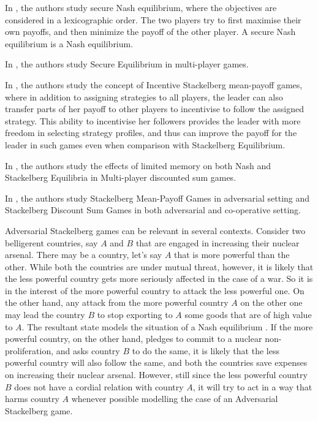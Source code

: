 In \cite{CHJ06}, the authors study secure Nash equilibrium, where the objectives are considered in a lexicographic order. The two players try to first maximise their own payoffs, and then minimize the payoff of the other player. A secure Nash equilibrium is a Nash equilibrium. 

In \cite{PFKSV14}, the authors study Secure Equilibrium in multi-player games.

In \cite{GSTDP16}, the authors study the concept of Incentive Stackelberg mean-payoff games, where in addition to assigning strategies to all players, the leader can also transfer parts of her payoff to other players to incentivise to follow the assigned strategy. This ability to incentivise her followers provides the leader with more freedom in selecting strategy profiles, and thus can improve the payoff for the leader in such games even when comparison with Stackelberg Equilibrium.

In \cite{GS15}, the authors study the effects of limited memory on both Nash and Stackelberg Equilibria in Multi-player discounted sum games. 

In \cite{FGR20}, the authors study Stackelberg Mean-Payoff Games in adversarial setting and  Stackelberg Discount Sum Games in both adversarial and co-operative setting.

Adversarial Stackelberg games can be relevant in several contexts. Consider two belligerent countries, say $A$ and $B$ that are engaged in increasing their nuclear arsenal. There may be a country, let's say $A$ that is more powerful than the other. While both the countries are under mutual threat, however, it is likely that the less powerful country gets more seriously affected in the case of a war. So it is in the interest of the more powerful country to attack the less powerful one. On the other hand, any attack from the more powerful country $A$ on the other one may lead the country $B$ to stop exporting to $A$ some goods that are of high value to $A$. The resultant state models the situation of a Nash equilibrium . If the more powerful country, on the other hand, pledges to commit to a nuclear non-proliferation, and asks country $B$ to do the same, it is likely that the less powerful country will also follow the same, and both the countries save expenses on increasing their nuclear arsenal. However, still since the less powerful country $B$ does not have a cordial relation with country $A$, it will try to act in a way that harms  country $A$ whenever possible modelling the case of an Adversarial Stackelberg game.

